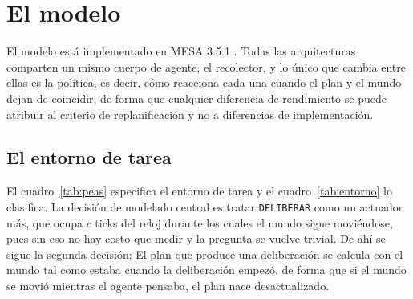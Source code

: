 \section{El modelo}\label{sec:modelo}

El modelo está implementado en MESA 3.5.1 \parencite{kazil2020mesa}. Todas las arquitecturas comparten un mismo cuerpo de agente, el recolector, y lo único que cambia entre ellas es la política, es decir, cómo reacciona cada una cuando el plan y el mundo dejan de coincidir, de forma que cualquier diferencia de rendimiento se puede atribuir al criterio de replanificación y no a diferencias de implementación.

\subsection{El entorno de tarea}

El cuadro~\ref{tab:peas} especifica el entorno de tarea y el cuadro~\ref{tab:entorno} lo clasifica. La decisión de modelado central es tratar \texttt{DELIBERAR} como un actuador más, que ocupa $c$ ticks del reloj durante los cuales el mundo sigue moviéndose, pues sin eso no hay costo que medir y la pregunta se vuelve trivial. De ahí se sigue la segunda decisión: El plan que produce una deliberación se calcula con el mundo tal como estaba cuando la deliberación empezó, de forma que si el mundo se movió mientras el agente pensaba, el plan nace desactualizado.

